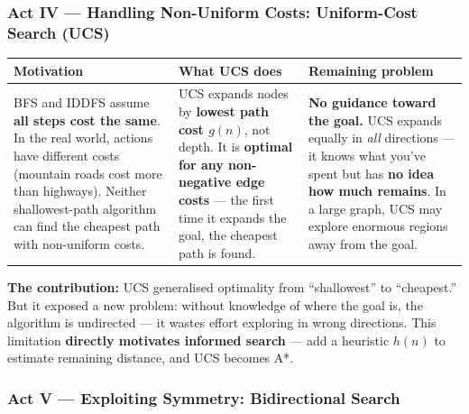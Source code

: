 \documentclass[12pt, a4paper]{article}
\begin{document}
\subsubsection*{Act IV — Handling Non-Uniform Costs: Uniform-Cost Search (UCS)}

\begin{center}
\renewcommand{\arraystretch}{1.2}
\begin{tabular}{p{3.5cm}|p{6cm}|p{6cm}}
\toprule
\textbf{Motivation} & \textbf{What UCS does} & \textbf{Remaining problem} \\
\midrule
BFS and IDDFS assume \textbf{all steps cost the same}. In the real world, actions have different costs (mountain roads cost more than highways). Neither shallowest-path algorithm can find the cheapest path with non-uniform costs. &
UCS expands nodes by \textbf{lowest path cost $g(n)$}, not depth. It is \textbf{optimal for any non-negative edge costs} — the first time it expands the goal, the cheapest path is found. &
\textbf{No guidance toward the goal.} UCS expands equally in \emph{all} directions — it knows what you've spent but has \textbf{no idea how much remains}. In a large graph, UCS may explore enormous regions away from the goal. \\
\bottomrule
\end{tabular}
\end{center}

\noindent\textbf{The contribution:} UCS generalised optimality from ``shallowest'' to ``cheapest.'' But it exposed a new problem: without knowledge of where the goal is, the algorithm is undirected — it wastes effort exploring in wrong directions. This limitation \textbf{directly motivates informed search} — add a heuristic $h(n)$ to estimate remaining distance, and UCS becomes A*.

\subsubsection*{Act V — Exploiting Symmetry: Bidirectional Search}
\end{document}

